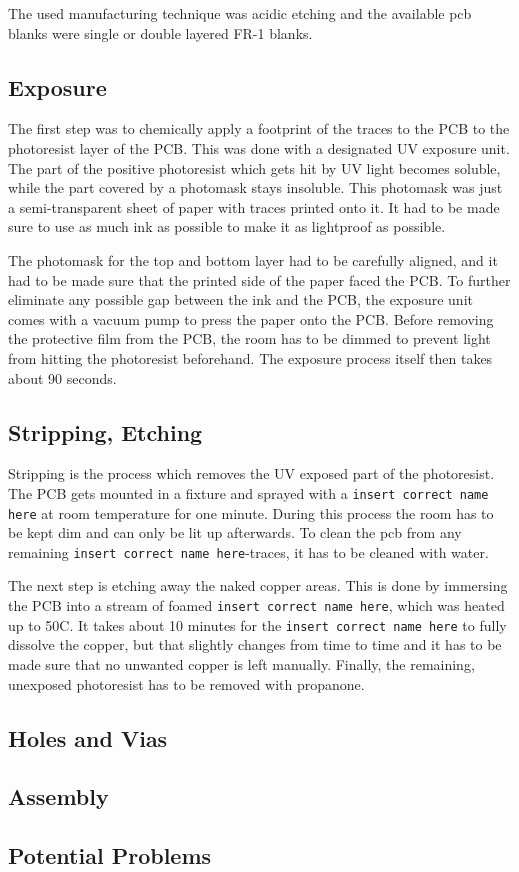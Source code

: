 The used manufacturing technique was acidic etching %
and the available \gls{pcb} blanks were single or double layered FR-1 blanks. %

\subsection{Exposure}

The first step was to chemically apply a footprint of the traces to the PCB to the photoresist layer of the PCB. This was done with a designated UV exposure unit. The part of the positive photoresist which gets hit by UV light becomes soluble, while the part covered by a photomask stays insoluble. This photomask was just a semi-transparent sheet of paper with traces printed onto it. It had to be made sure to use as much ink as possible to make it as lightproof as possible.

The photomask for the top and bottom layer had to be carefully aligned, and it had to be made sure that the printed side of the paper faced the PCB. To further eliminate any possible gap between the ink and the PCB, the exposure unit comes with a vacuum pump to press the paper onto the PCB. Before removing the protective film from the PCB, the room has to be dimmed to prevent light from hitting the photoresist beforehand. The exposure process itself then takes about 90 seconds.

\subsection{Stripping, Etching}

Stripping is the process which removes the UV exposed part of the photoresist. The PCB gets mounted in a fixture and sprayed with a \texttt{insert correct name here} at room temperature for one minute. During this process the room has to be kept dim and can only be lit up afterwards. To clean the \gls{pcb} from any remaining \texttt{insert correct name here}-traces, it has to be cleaned with water. %

The next step is etching away the naked copper areas. This is done by immersing the PCB into a stream of foamed \texttt{insert correct name here}, which was heated up to 50\textdegree C. It takes about 10 minutes for the \texttt{insert correct name here} to fully dissolve the copper, but that slightly changes from time to time and it has to be made sure that no unwanted copper is left manually. Finally, the remaining, unexposed photoresist has to be removed with propanone.

\subsection{Holes and Vias}



\subsection{Assembly}

\subsection{Potential Problems}